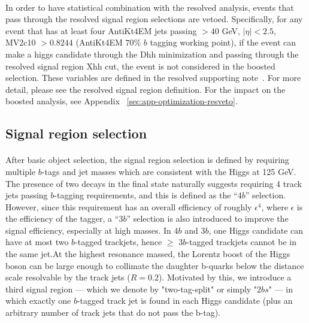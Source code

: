 \paragraph{}
In order to have statistical combination with the resolved analysis, events that pass through the resolved signal region selections are vetoed. Specifically, for any event that has at least four AntiKt4EM jets passing \pt $> 40 $ GeV, $|\eta| < 2.5$, MV2c10 $ > 0.8244$ (AntiKt4EM $70\%$ $b$ tagging working point), if the event can make a higgs candidate through the Dhh minimization and passing through the resolved signal region Xhh cut, the event is not considered in the boosted selection. These variables are defined in the resolved supporting note~\cite{ResolvedINT_2017}. For more detail, please see the resolved signal region definition. For the impact on the boosted analysis, see Appendix ~\ref{sec:app-optimization-resveto}.


\subsection{Signal region selection}
\paragraph{}
After basic object selection, the signal region selection is defined by requiring multiple $b$-tags and jet masses which are consistent with the Higgs at 125 GeV. The presence of two \hbb decays in the final state naturally suggests requiring 4 track jets passing $b$-tagging requirements, and this is defined as the ``4$b$'' selection. However, since this requirement has an overall efficiency of roughly $\epsilon^4$, where $\epsilon$ is the efficiency of the tagger, a ``3$b$'' selection is also introduced to improve the signal efficiency, especially at high masses. In 4$b$ and 3$b$, one Higgs candidate can have at most two $b$-tagged trackjets, hence $\geq$ 3$b$-tagged trackjets cannot be in the same \largeR jet.At the highest resonance massed, the Lorentz boost of the Higgs boson can be large enough to collimate the daughter b-quarks below the distance scale resolvable by the track jets ($R=0.2$). Motivated by this, we introduce a third signal region --- which we denote by "two-tag-split" or simply  "$2bs$" --- in which exactly one $b$-tagged track jet is found in each Higgs candidate (plus an arbitrary number of track jets that do not pass the b-tag).

